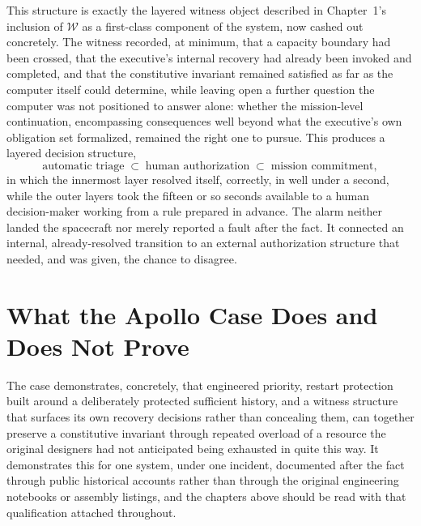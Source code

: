 \documentclass[11pt]{report}
\begin{document}
This structure is exactly the layered witness object described in Chapter~1's inclusion of $\mathcal W$ as a first-class component of the system, now cashed out concretely. The witness recorded, at minimum, that a capacity boundary had been crossed, that the executive's internal recovery had already been invoked and completed, and that the constitutive invariant remained satisfied as far as the computer itself could determine, while leaving open a further question the computer was not positioned to answer alone: whether the mission-level continuation, encompassing consequences well beyond what the executive's own obligation set formalized, remained the right one to pursue. This produces a layered decision structure,
\[
\text{automatic triage} \;\subset\; \text{human authorization} \;\subset\; \text{mission commitment},
\]
in which the innermost layer resolved itself, correctly, in well under a second, while the outer layers took the fifteen or so seconds available to a human decision-maker working from a rule prepared in advance. The alarm neither landed the spacecraft nor merely reported a fault after the fact. It connected an internal, already-resolved transition to an external authorization structure that needed, and was given, the chance to disagree.

\chapter{What the Apollo Case Does and Does Not Prove}

The case demonstrates, concretely, that engineered priority, restart protection built around a deliberately protected sufficient history, and a witness structure that surfaces its own recovery decisions rather than concealing them, can together preserve a constitutive invariant through repeated overload of a resource the original designers had not anticipated being exhausted in quite this way. It demonstrates this for one system, under one incident, documented after the fact through public historical accounts rather than through the original engineering notebooks or assembly listings, and the chapters above should be read with that qualification attached throughout.
\end{document}
